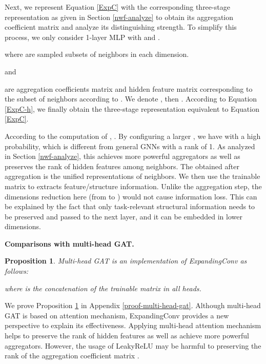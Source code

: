 \documentclass{article} \usepackage{iclr2021_conference,times}
\newtheorem{proposition}{Proposition}
\begin{document}
Next, we represent Equation \ref{ExpC} with the corresponding three-stage representation as given in Section \ref{nwf-analyze}
to obtain its aggregation coefficient matrix and analyze its distinguishing strength.
To simplify this process, we only consider 1-layer MLP with  and .
\begin{small}

\end{small}
where  are sampled subsets of neighbors in each dimension.

and

are aggregation coefficients matrix and hidden feature matrix corresponding to the subset of neighbors  according to .
We denote , then
.
According to Equation \ref{ExpC-h}, we finally obtain the three-stage representation equivalent to Equation \ref{ExpC}.
\begin{small}

\end{small}
According to the computation of , .
By configuring a larger ,
we have  with a high probability, which is different from general GNNs with a rank of 1.
As analyzed in Section \ref{nwf-analyze},
this achieves more powerful aggregators as well as preserves the rank of hidden features among neighbors.
The obtained  after aggregation is the unified representations of neighbors.
We then use the trainable matrix  to extracts feature/structure information.
Unlike the aggregation step, the dimensions reduction here (from  to ) would not cause information loss.
This can be explained by the fact that only task-relevant structural information needs to be preserved and passed to the next layer,
and it can be embedded in lower dimensions.

\textbf{Comparisons with multi-head GAT.}
\begin{proposition}
Multi-head GAT is an implementation of ExpandingConv as follows:

where  is the concatenation of the trainable matrix in all  heads.
\label{multi-head-gat}
\end{proposition}
We prove Proposition \ref{multi-head-gat} in Appendix \ref{proof-multi-head-gat}.
Although multi-head GAT is based on attention mechanism, ExpandingConv provides a new perspective to explain its effectiveness.
Applying multi-head attention mechanism helps to preserve the rank of hidden features as well as achieve more powerful aggregators.
However, the usage of LeakyReLU may be harmful to preserving the rank of the aggregation coefficient matrix \citep{luan2019break}.
\end{document}
